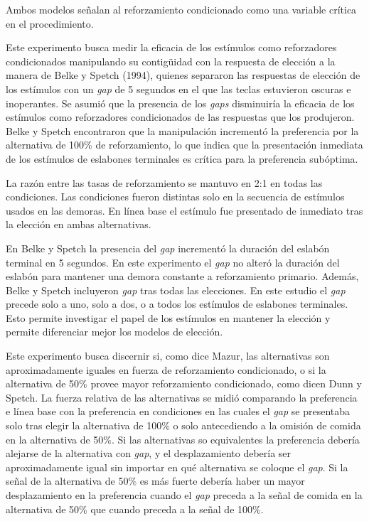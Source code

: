 \documentclass[a4paper,12pt]{article}
\begin{document}
Ambos modelos señalan al reforzamiento condicionado como una variable crítica en el procedimiento.

Este experimento busca medir la eficacia de los estímulos como reforzadores condicionados manipulando su contigüidad con la respuesta de elección a la manera de Belke y Spetch (1994), quienes separaron las respuestas de elección de los estímulos con un {\itshape gap} de 5 segundos en el que las teclas estuvieron oscuras e inoperantes. Se asumió que la presencia de los {\itshape gaps} disminuiría la eficacia de los estímulos como reforzadores condicionados de las respuestas que los produjeron. Belke y Spetch encontraron que la manipulación incrementó la preferencia por la alternativa de 100\% de reforzamiento, lo que indica que la presentación inmediata de los estímulos de eslabones terminales es crítica para la preferencia subóptima. 

La razón entre las tasas de reforzamiento se mantuvo en 2:1 en todas las condiciones. Las condiciones fueron distintas solo en la secuencia de estímulos usados en las demoras. En línea base el estímulo fue presentado de inmediato tras la elección en ambas alternativas.

En Belke y Spetch la presencia del {\itshape gap} incrementó la duración del eslabón terminal en 5 segundos. En este experimento el {\itshape gap} no alteró la duración del eslabón para mantener una demora constante a reforzamiento primario. Además, Belke y Spetch incluyeron {\itshape gap} tras todas las elecciones. En este estudio el {\itshape gap} precede solo a uno, solo a dos, o a todos los estímulos de eslabones terminales. Esto permite investigar el papel de los estímulos en mantener la elección y permite diferenciar mejor los modelos de elección.

Este experimento busca discernir si, como dice Mazur, las alternativas son aproximadamente iguales en fuerza de reforzamiento condicionado, o si la alternativa de 50\% provee mayor reforzamiento condicionado, como dicen Dunn y Spetch. La fuerza relativa de las alternativas se midió comparando la preferencia e línea base con la preferencia en condiciones en las cuales el {\itshape gap} se presentaba solo tras elegir la alternativa de 100\% o solo antecediendo a la omisión de comida en la alternativa de 50\%. Si las alternativas so equivalentes la preferencia debería alejarse de la alternativa con {\itshape gap}, y el desplazamiento debería ser aproximadamente igual sin importar en qué alternativa se coloque el {\itshape gap}. Si la señal de la alternativa de 50\% es más fuerte debería haber un mayor desplazamiento en la preferencia cuando el {\itshape gap} preceda a la señal de comida en la alternativa de 50\% que cuando preceda a la señal de 100\%. 
\end{document}
